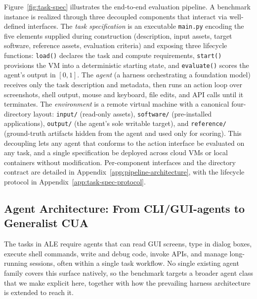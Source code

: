 \documentclass{llmxive}
\begin{document}
Figure~\ref{fig:task-spec} illustrates the end-to-end evaluation pipeline. A benchmark instance is realized through three decoupled components that interact via well-defined interfaces. The \textit{task specification} is an executable \texttt{main.py} encoding the five elements supplied during construction (description, input assets, target software, reference assets, evaluation criteria) and exposing three lifecycle functions: \texttt{load()} declares the task and compute requirements, \texttt{start()} provisions the VM into a deterministic starting state, and \texttt{evaluate()} scores the agent's output in $[0, 1]$. The \textit{agent} (a harness orchestrating a foundation model) receives only the task description and metadata, then runs an action loop over screenshots, shell output, mouse and keyboard, file edits, and API calls until it terminates. The \textit{environment} is a remote virtual machine with a canonical four-directory layout: \texttt{input/} (read-only assets), \texttt{software/} (pre-installed applications), \texttt{output/} (the agent's sole writable target), and \texttt{reference/} (ground-truth artifacts hidden from the agent and used only for scoring). This decoupling lets any agent that conforms to the action interface be evaluated on any task, and a single specification be deployed across cloud VMs or local containers without modification. Per-component interfaces and the directory contract are detailed in Appendix~\ref{app:pipeline-architecture}, with the lifecycle protocol in Appendix~\ref{app:task-spec-protocol}.

\vspace{-0.4em}
\subsection{Agent Architecture: From CLI/GUI-agents to Generalist CUA}
\label{sec:agent-architecture}
\vspace{-0.4em}
The tasks in ALE require agents that can read GUI screens, type in dialog boxes, execute shell commands, write and debug code, invoke APIs, and manage long-running sessions, often within a single task workflow. No single existing agent family covers this surface natively, so the benchmark targets a broader agent class that we make explicit here, together with how the prevailing harness architecture is extended to reach it.
\end{document}
